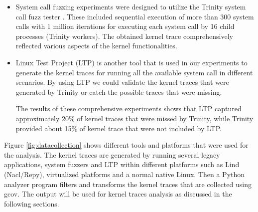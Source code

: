 \begin{itemize}
\item System call fuzzing experiments were designed to utilize the Trinity
 system call fuzz tester \cite{Trinity}. These included sequential execution of more than 300 system calls with 1 million iterations 
 for executing each system call by 16 child processes (Trinity workers). The obtained kernel trace comprehensively reflected various aspects of the kernel functionalities.

\item Linux Test Project (LTP) \cite{LTP} is another tool that is used in our experiments to generate the kernel traces 
for running all the available system call in different scenarios. By using LTP we could validate the kernel traces that 
were generated by Trinity or catch the possible traces that were missing.

The results of these comprehensive experiments shows that LTP captured approximately 20\% of kernel traces that were missed by Trinity, 
while Trinity provided about 15\% of kernel trace that were not included by LTP.

\end{itemize}

Figure \ref{fig:datacollection} shows different tools and platforms that were used
 for the analysis. The kernel traces are generated by running several legacy
  applications, system fuzzers and LTP within different platforms such as
  Lind (Nacl/Repy), virtualized platforms and a normal native Linux. Then a Python
   analyzer program filters and transforms the kernel traces that are collected
    using gcov. The output will be used for kernel traces analysis as
    discussed in the following sections.

